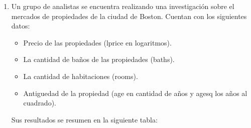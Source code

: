 \documentclass[10pt,a4paper]{article}
\begin{document}
\begin{enumerate}
\begin{enumerate}
{    Sustituimos los valores:
    \[
    F = \frac{(0.62 - 0.45)/2}{(1 - 0.62)/(182 - 3 - 1)} = \frac{0.17/2}{0.38/178} = \frac{0.085}{0.00213} \approx 39.91
    \]
    
    \begin{itemize}
        \item Valor crítico: Para \( j=2 \) y \( n-k-1=178 \) grados de libertad, con \(\alpha=0.01\), el valor crítico al 1\% es aproximadamente \( F_{2,178} \approx 4.72 \).
    \end{itemize}
    
    Por lo tanto, dado que \( F \approx 39.91 \gg 4.72 \), se rechaza la hipótesis nula al 1\% de significancia. Es decir, el modelo no restringido (2) es significativamente mejor que el restringido (1).
}

\end{enumerate}

\item Un grupo de analistas se encuentra realizando una investigación sobre  el mercados de propiedades de la ciudad de Boston.  
Cuentan con los siguientes datos:

\begin{itemize}
    \item Precio de las propiedades (lprice en logaritmos).
    \item La cantidad de baños de las propiedades (baths). 
    \item La cantidad de habitaciones (rooms).
        \item Antiguedad de la propiedad (age en cantidad de años y agesq los años al cuadrado). 
\end{itemize}

Sus resultados se resumen en la siguiente  tabla:


\end{enumerate}
\end{document}
